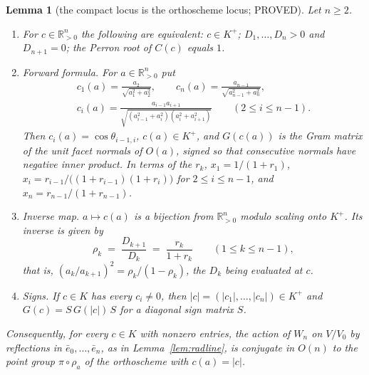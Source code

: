 \documentclass[11pt]{article}
\newtheorem{lemma}[theorem]{Lemma}
\theoremstyle{definition}
\theoremstyle{remark}
\theoremstyle{definition}
\newcommand{\R}{\mathbb{R}}
\begin{document}
\begin{lemma}[the compact locus is the orthoscheme locus; PROVED]\label{lem:Kplus}
Let $n\ge2$.
\begin{enumerate}[label=\textup{(\roman*)},leftmargin=2.4em]
\item For $c\in\R_{>0}^n$ the following are equivalent: $c\in K^+$; $D_1,\dots,D_n>0$ and
$D_{n+1}=0$; the Perron root of $C(c)$ equals $1$.
\item \emph{Forward formula.} For $a\in\R_{>0}^n$ put
\begin{gather*}
 c_1(a)=\frac{a_2}{\sqrt{a_1^2+a_2^2}},\qquad
 c_n(a)=\frac{a_{n-1}}{\sqrt{a_{n-1}^2+a_n^2}},\\
 c_i(a)=\frac{a_{i-1}a_{i+1}}{\sqrt{(a_{i-1}^2+a_i^2)(a_i^2+a_{i+1}^2)}}\qquad(2\le i\le n-1).
\end{gather*}
Then $c_i(a)=\cos\theta_{i-1,i}$, $c(a)\in K^+$, and $G(c(a))$ is the Gram matrix of the unit
facet normals of $O(a)$, signed so that consecutive normals have negative inner product. In terms
of the $r_k$, $x_1=1/(1+r_1)$, $x_i=r_{i-1}/\bigl((1+r_{i-1})(1+r_i)\bigr)$ for $2\le i\le n-1$,
and $x_n=r_{n-1}/(1+r_{n-1})$.
\item \emph{Inverse map.} $a\mapsto c(a)$ is a bijection from $\R_{>0}^n$ modulo scaling onto
$K^+$. Its inverse is given by
\[
  \rho_k\;=\;\frac{D_{k+1}}{D_k}\;=\;\frac{r_k}{1+r_k}\qquad(1\le k\le n-1),
\]
that is, $(a_k/a_{k+1})^2=\rho_k/(1-\rho_k)$, the $D_k$ being evaluated at $c$.
\item \emph{Signs.} If $c\in K$ has every $c_i\ne0$, then $|c|=(|c_1|,\dots,|c_n|)\in K^+$ and
$G(c)=S\,G(|c|)\,S$ for a diagonal sign matrix $S$.
\end{enumerate}
Consequently, for every $c\in K$ with nonzero entries, the action of $W_n$ on $V/V_0$ by
reflections in $\bar e_0,\dots,\bar e_n$, as in Lemma~\ref{lem:radline}, is conjugate in $O(n)$
to the point group $\pi\circ\rho_a$ of the orthoscheme with $c(a)=|c|$.
\end{lemma}
\end{document}
